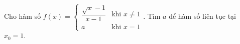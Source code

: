 \begin{ex}
Cho hàm số $f(x)=\begin{cases}\dfrac{\sqrt x-1}{x-1}&\text{khi }x\ne1\\a&\text{khi }x=1\end{cases}$. Tìm $a$ để hàm số liên tục tại $x_0=1$.
\end{ex}
